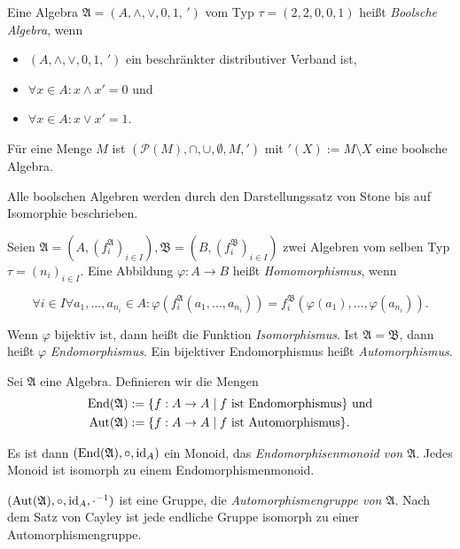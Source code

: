 \begin{definition}
    Eine Algebra $\mathfrak{A} = (A, \wedge, \vee, 0, 1, \,')$ vom Typ $\tau = (2,2,0,0,1)$ heißt \emph{Boolsche Algebra}, wenn
    \begin{itemize}[topsep=0pt, label={--}]
        \item $(A, \wedge, \vee, 0, 1, \,')$ ein beschränkter distributiver Verband ist,
        \item $\forall x \in A: x \wedge x' = 0$ und
        \item $\forall x \in A: x \vee x' = 1$.
    \end{itemize}
\end{definition}

\begin{example}
    Für eine Menge $M$ ist $(\mathcal{P}(M), \cap, \cup, \emptyset, M, ')$ mit $'(X) := M \setminus X$ eine boolsche Algebra.
\end{example}

\begin{remark}
    Alle boolschen Algebren werden durch den Darstellungssatz von Stone bis auf Isomorphie beschrieben.
\end{remark}

\begin{definition}
    Seien $\mathfrak{A} = (A, (f_i^\mathfrak{A})_{i \in I}), \mathfrak{B} = (B, (f_i^\mathfrak{B})_{i \in I})$ zwei Algebren vom selben Typ $\tau = (n_i)_{i \in I}$. Eine Abbildung $\varphi: A \to B$ heißt \emph{Homomorphismus}, wenn

    $$\forall i \in I \forall a_1, \ldots, a_{n_i} \in A: \varphi(f_i^\mathfrak{A}(a_1, \ldots, a_{n_i})) = f_i^\mathfrak{B}(\varphi(a_1), \ldots, \varphi(a_{n_i})). $$

    Wenn $\varphi$ bijektiv ist, dann heißt die Funktion \emph{Isomorphismus}.
    Ist $\mathfrak{A} = \mathfrak{B}$, dann heißt $\varphi$ \emph{Endomorphismus}. Ein bijektiver Endomorphismus heißt \emph{Automorphismus}.
\end{definition}

\begin{example}
    Sei $\mathfrak{A}$ eine Algebra. Definieren wir die Mengen \begin{align*}
        \operatorname{End}(\mathfrak{A}) &:= \{f: A \to A \;\vert\; f\text{ ist Endomorphismus}\} \text{ und} \\ \operatorname{Aut}(\mathfrak{A}) &:= \{f: A \to A \;\vert\; f\text{ ist Automorphismus}\}.
    \end{align*}

    Es ist dann $(\operatorname{End}(\mathfrak{A}), \circ, \operatorname{id}_A)$ ein Monoid, das \emph{Endomorphisenmonoid von $\mathfrak{A}$}. Jedes Monoid ist isomorph zu einem Endomorphismenmonoid.
    
    $(\operatorname{Aut}(\mathfrak{A}), \circ, \operatorname{id}_A, \cdot^{-1})$ ist eine Gruppe, die \emph{Automorphismengruppe von $\mathfrak{A}$}. Nach dem Satz von Cayley ist jede endliche Gruppe isomorph zu einer Automorphismengruppe.
\end{example}
